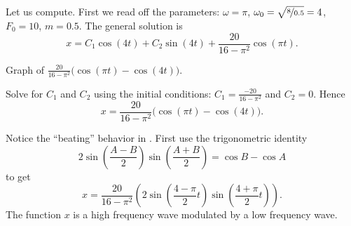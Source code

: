 \documentclass{ximera}
\begin{document}
\begin{exampleSol}
    Let us compute.  First we read off the parameters: $\omega = \pi$, $\omega_0 = \sqrt{\nicefrac{8}{0.5}} = 4$, $F_0 = 10$, $m=0.5$.  The general solution is 
    \begin{equation*}
        x = C_1 \cos (4 t) + C_2 \sin (4 t) + \frac{20}{16 - \pi^2} \cos (\pi t) .
    \end{equation*}
    
    \begin{mywrapfig}[15]{3.25in}
        \capstart
        \caption{Graph of $\frac{20}{16 - \pi^2} \bigl( \cos (\pi t)- \cos (4 t) \bigr)$.\label{3.6:beatingfig}}
    \end{mywrapfig}
    
    
    Solve for $C_1$ and $C_2$ using the initial conditions: $C_1 = \frac{-20}{16 - \pi^2}$ and $C_2 = 0$.  Hence
    \begin{equation*}
        x = \frac{20}{16 - \pi^2} \bigl( \cos (\pi t)- \cos (4 t) \bigr) .
    \end{equation*}
    
    
    Notice the ``beating'' behavior in .  First use the trigonometric identity
    \begin{equation*}
        2\sin \left( \frac{A-B}{2} \right) \sin \left( \frac{A+B}{2} \right) = \cos B -\cos A 
    \end{equation*}
    to get 
    \begin{equation*}
        x = \frac{20}{16 - \pi^2} \left( 2 \sin \left(\frac{4-\pi}{2} t \right) \sin \left( \frac{4+\pi}{2} t \right) \right) .
    \end{equation*}
    The function $x$ is a high frequency wave modulated by a low frequency wave.
\end{exampleSol}
\end{document}
